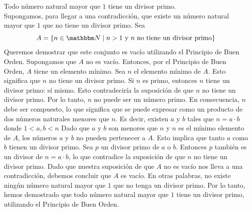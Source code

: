 \begin{example}
    Todo número natural mayor que $1$ tiene un divisor primo. \\
    \demostracion Supongamos, para llegar a una contradicción, que existe un número natural mayor que $1$ que no tiene un divisor primo. Sea
    $$A = \{ n \in \NN \mid n > 1 \text{ y } n \text{ no tiene un divisor primo} \}$$
    Queremos demostrar que este conjunto es vacío utilizando el Principio de Buen Orden. Supongamos que $A$ no es vacío. Entonces, por el Principio de Buen Orden, $A$ tiene un elemento mínimo. Sea $n$ el elemento mínimo de $A$. Esto significa que $n$ no tiene un divisor primo. Si $n$ es primo, entonces $n$ tiene un divisor primo: sí mismo. Esto contradeciría la suposición de que $n$ no tiene un divisor primo. Por lo tanto, $n$ no puede ser un número primo. En consecuencia, $n$ debe ser compuesto, lo que significa que se puede expresar como un producto de dos números naturales menores que $n$. Es decir, existen $a$ y $b$ tales que $n = a \cdot b$ donde $1 < a, b < n$ Dado que $a$ y $b$ son menores que $n$ y $n$ es el mínimo elemento de $A$, los números $a$ y $b$ no pueden pertenecer a $A$. Esto implica que tanto $a$ como $b$ tienen un divisor primo. Sea $p$ un divisor primo de $a$ o $b$. Entonces $p$ también es un divisor de $n = a \cdot b$, lo que contradice la suposición de que $n$ no tiene un divisor primo. Dado que nuestra suposición de que $A$ no es vacío nos lleva a una contradicción, debemos concluir que $A$ es vacío. En otras palabras, no existe ningún número natural mayor que $1$ que no tenga un divisor primo. Por lo tanto, hemos demostrado que todo número natural mayor que $1$ tiene un divisor primo, utilizando el Principio de Buen Orden.
\end{example}

